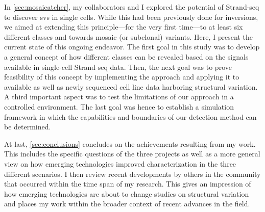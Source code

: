 In \cref{sec:mosaicatcher}, my collaborators and I explored the potential of
Strand-seq to discover \acp{sv} in single cells. While this had been previously
done for inversions, we aimed at extending this principle---for the very first
time---to at least six different \sv classes and towards mosaic (or subclonal)
variants.  Here, I present the current state of this ongoing endeavor. The first
goal in this study was to develop a general concept of how different \sv classes
can be revealed based on the signals available in single-cell Strand-seq data.
Then, the next goal was to prove feasibility of this concept by implementing the
approach and applying it to available as well as newly sequenced cell line data
harboring structural variation. A third important aspect was to test the
limitations of our approach in a controlled environment. The last goal was hence
to establish a simulation framework in which the capabilities and boundaries of
our \sv detection method can be determined.

At last, \cref{sec:conclusions} concludes on the achievements resulting from my
work. This includes the specific questions of the three projects as well as a
more general view on how emerging technologies improved \sv characterization in
the three different scenarios. I then review recent developments by others in
the community that occurred within the time span of my research. This gives an
impression of how emerging technologies are about to change studies on
structural variation and places my work within the broader context of recent
advances in the field.

